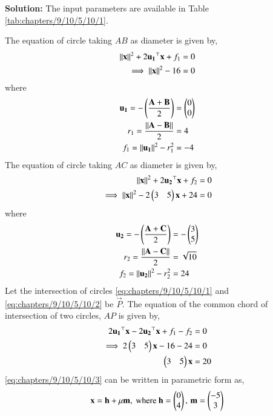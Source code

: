 \documentclass[journal,12pt,twocolumn]{IEEEtran}
\begin{document}
\begin{enumerate}
\textbf{Solution:}
\fi
The input parameters are available in Table 
\ref{tab:chapters/9/10/5/10/1}.
\begin{table}[H]
\centering

\caption{}
\label{tab:chapters/9/10/5/10/1}
\end{table}
The equation of circle taking $AB$ as diameter is given by,
\begin{align}
\left\lVert\mathbf{x}\right\rVert^2 + 2\mathbf{u_1}^\top\mathbf{x} + f_1 &= 0 \\
\implies 
\left\lVert\mathbf{x}\right\rVert^2 -16 &= 0
\label{eq:chapters/9/10/5/10/1}
\end{align}
where
\begin{align}
\mathbf{u_1} = -\left(\frac{\mathbf{A}+\mathbf{B}}{2}\right)
&= \begin{pmatrix}0\\0\end{pmatrix}\\
r_1 = \frac{\left\lVert\mathbf{A}-\mathbf{B}\right\rVert}{2}
&= 4\\
f_1 = \left\lVert\mathbf{u_1}\right\rVert^2 - r_1^2
&= -4
\end{align}
The equation of circle taking $AC$ as diameter is given by,
\begin{align}
\left\lVert\mathbf{x}\right\rVert^2 + 2\mathbf{u_2}^\top\mathbf{x} + f_2 &= 0 \\
\implies \left\lVert\mathbf{x}\right\rVert^2 -2\begin{pmatrix}3&5\end{pmatrix}\mathbf{x}+24 &= 0
\label{eq:chapters/9/10/5/10/2}
\end{align}
where
\begin{align}
\mathbf{u_2} = -\left(\frac{\mathbf{A}+\mathbf{C}}{2}\right)
&= -\begin{pmatrix}3\\5\end{pmatrix}\\
r_2 = \frac{\left\lVert\mathbf{A}-\mathbf{C}\right\rVert}{2}
&= \sqrt{10}\\
f_2 = \left\lVert\mathbf{u_2}\right\rVert^2 - r_2^2
&= 24
\end{align}
Let the intersection of circles \eqref{eq:chapters/9/10/5/10/1} and \eqref{eq:chapters/9/10/5/10/2} be $\vec{P}$. The equation of the common chord of intersection of two circles, $AP$ is given by,
\begin{align}
2\mathbf{u_1}^\top\mathbf{x}-2\mathbf{u_2}^\top\mathbf{x}+f_1 - f_2 &= 0\\
\implies
2\begin{pmatrix}3 & 5\end{pmatrix}\mathbf{x}-16-24&= 0\\
\begin{pmatrix}3&5\end{pmatrix}\mathbf{x} &= 20
\label{eq:chapters/9/10/5/10/3}
\end{align}
\eqref{eq:chapters/9/10/5/10/3} can be written in parametric form as,
\begin{align}
	\vec{x} =  \vec{h}+ \mu \vec{m}, \text{ where }
\vec{h} = \myvec{0\\4}, \, \vec{m} = \myvec{-5\\3}

\end{align}
\end{enumerate}
\end{document}
